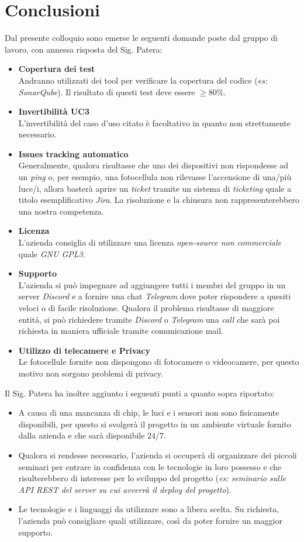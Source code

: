\documentclass[a4paper, 12pt]{article}
\begin{document}
\section*{Conclusioni}
Dal presente colloquio sono emerse le seguenti domande poste dal gruppo di lavoro, con annessa risposta del Sig. Patera:
\begin{itemize}
    \item \textbf{Copertura dei test} \\ Andranno utilizzati dei tool per verificare la copertura del codice (\textit{es: SonarQube}). Il risultato di questi test deve essere $\geq 80\%$.
    \item \textbf{Invertibilità UC3} \\ L'invertibilità del caso d'uso citato è facoltativo in quanto non strettamente necessario.
    \item \textbf{Issues tracking automatico} \\ Generalmente, qualora risultasse che uno dei dispositivi non rispondesse ad un \textit{ping} o, per esempio, una fotocellula non rilevasse l'accensione di una/più luce/i, allora basterà aprire un \textit{ticket} tramite un sistema di \textit{ticketing} quale a titolo esemplificativo \textit{Jira}. La risoluzione e la chiusura non rappresenterebbero una nostra competenza.
    \item \textbf{Licenza} \\ L'azienda consiglia di utilizzare una licenza \textit{open-source non commerciale} quale \textit{GNU GPL3}.
    \item \textbf{Supporto} \\ L'azienda si può impegnare ad aggiungere tutti i membri del gruppo in un server \textit{Discord} e a fornire una chat \textit{Telegram} dove poter rispondere a quesiti veloci o di facile risoluzione. Qualora il problema risultasse di maggiore entità, si può richiedere tramite \textit{Discord} o \textit{Telegram} una \textit{call} che sarà poi richiesta in maniera ufficiale tramite comunicazione mail.
    \item \textbf{Utilizzo di telecamere e Privacy} \\ Le fotocellule fornite non dispongono di fotocamere o videocamere, per questo motivo non sorgono problemi di privacy.
\end{itemize}
Il Sig. Patera ha inoltre aggiunto i seguenti punti a quanto sopra riportato:
\begin{itemize}
    \item A causa di una mancanza di chip, le luci e i sensori non sono fisicamente disponibili, per questo si svolgerà il progetto in un ambiente virtuale fornito dalla azienda e che sarà disponibile $24/7$.
    \item Qualora si rendesse necessario, l'azienda si occuperà di organizzare dei piccoli seminari per entrare in confidenza con le tecnologie in loro possesso e che risulterebbero di interesse per lo sviluppo del progetto (\textit{es: seminario sulle API REST del server su cui avverrà il deploy del progetto}).
    \item Le tecnologie e i linguaggi da utilizzare sono a libera scelta. Su richiesta, l'azienda può consigliare quali utilizzare, così da poter fornire un maggior supporto.
\end{itemize}
\end{document}
